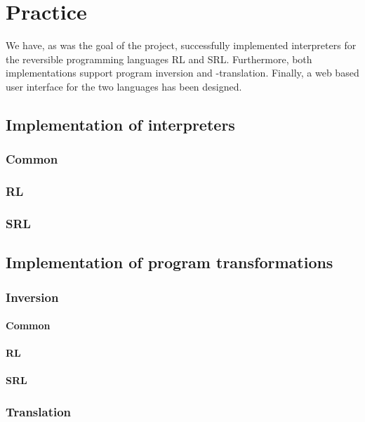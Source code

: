 \chapter*{Practice}
%

We have, as was the goal of the project, successfully implemented interpreters for the reversible programming languages RL and SRL. Furthermore, both implementations support program inversion and -translation. Finally, a web based user interface for the two languages has been designed.

\section*{Implementation of interpreters}
\subsection*{Common}
\subsection*{RL}
\subsection*{SRL}

\section*{Implementation of program transformations}
\subsection*{Inversion}
\subsubsection*{Common}
\subsubsection*{RL}
\subsubsection*{SRL}

\subsection*{Translation}
